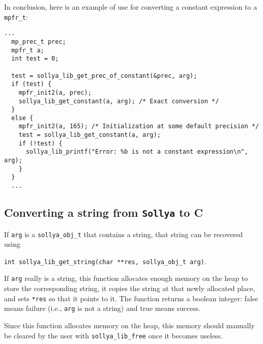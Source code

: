 \documentclass[a4paper]{article}
\newcommand{\sollya}{\texttt{Sollya}\xspace}
\begin{document}
In conclusion, here is an example of use for converting a constant expression to a \verb|mpfr_t|:

\begin{center}\begin{minipage}{15cm}\begin{Verbatim}[frame=single]
  ...
  mp_prec_t prec;
  mpfr_t a;
  int test = 0;

  test = sollya_lib_get_prec_of_constant(&prec, arg);
  if (test) {
    mpfr_init2(a, prec);
    sollya_lib_get_constant(a, arg); /* Exact conversion */
  }
  else {
    mpfr_init2(a, 165); /* Initialization at some default precision */
    test = sollya_lib_get_constant(a, arg);
    if (!test) {
      sollya_lib_printf("Error: %b is not a constant expression\n", arg);
    }
  }
  ...
\end{Verbatim}
\end{minipage}\end{center}

\subsection{Converting a string from \sollya to C}
If \verb|arg| is a \verb|sollya_obj_t| that contains a string, that string can be recovered using
\begin{center}
\verb|int sollya_lib_get_string(char **res, sollya_obj_t arg)|.
\end{center}
If \verb|arg| really is a string, this function allocates enough memory on the heap to store the corresponding string, it copies the string at that newly allocated place, and sets \verb|*res| so that it points to it. The function returns a boolean integer: false means failure (i.e., \verb|arg| is not a string) and true means success.

Since this function allocates memory on the heap, this memory should manually be cleared by the user with \verb|sollya_lib_free| once it becomes useless.
\end{document}
